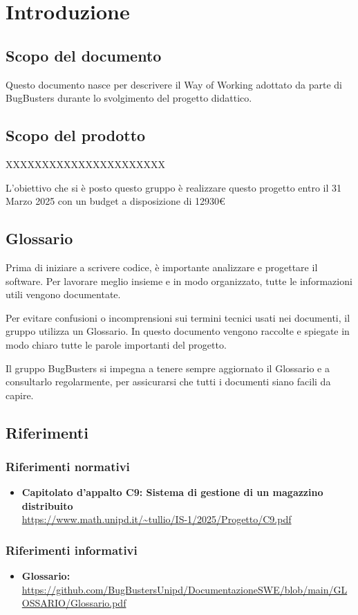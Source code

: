 \documentclass[a4paper,11pt]{article}
\begin{document}
\section{Introduzione}

\subsection{Scopo del documento}
Questo documento nasce per descrivere il Way of Working adottato da parte di BugBusters durante lo svolgimento del progetto didattico.

\subsection{Scopo del prodotto}
XXXXXXXXXXXXXXXXXXXXXX

L'obiettivo che si è posto questo gruppo è realizzare questo progetto entro il 31 Marzo 2025 con un budget a disposizione di 12930€

\subsection{Glossario}
Prima di iniziare a scrivere codice, è importante analizzare e progettare il software. Per lavorare meglio insieme e in modo organizzato, tutte le informazioni utili vengono documentate.

Per evitare confusioni o incomprensioni sui termini tecnici usati nei documenti, il gruppo utilizza un Glossario. In questo documento vengono raccolte e spiegate in modo chiaro tutte le parole importanti del progetto.

Il gruppo BugBusters si impegna a tenere sempre aggiornato il Glossario e a consultarlo regolarmente, per assicurarsi che tutti i documenti siano facili da capire.

\newpage

\subsection{Riferimenti}

\subsubsection{Riferimenti normativi}
\begin{itemize}
\item \textbf{Capitolato d'appalto C9: Sistema di gestione di un magazzino distribuito}\\
\url{https://www.math.unipd.it/~tullio/IS-1/2025/Progetto/C9.pdf}
\end{itemize}

\subsubsection{Riferimenti informativi}
\begin{itemize}
\item \textbf{Glossario:}\\
\url{https://github.com/BugBustersUnipd/DocumentazioneSWE/blob/main/GLOSSARIO/Glossario.pdf}
\end{itemize}
\end{document}
